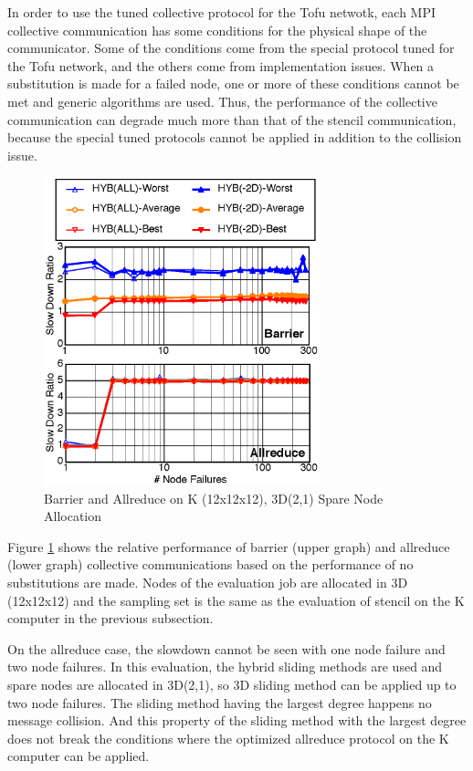 \documentclass[Afour,times,sagev]{sagej}
\begin{document}
In order to use the tuned collective protocol for the Tofu netwotk,
each MPI collective communication has some conditions for the physical
shape of the communicator. Some of the conditions come from the
special protocol tuned for the Tofu network, and the others come from
implementation issues. When a substitution is made for a failed node,
one or more of these conditions cannot be met and generic algorithms
are used. Thus, the performance of the collective communication can
degrade much more than that of the stencil communication, because the
special tuned protocols cannot be applied in addition to the collision
issue. 

\begin{figure}[ht]
\centering
\includegraphics[width=80mm]{Figs/K-Collective-CL.eps}
  \caption{Barrier and Allreduce on K (12x12x12), 3D(2,1) Spare Node
    Allocation}
  \label{fig:k-collective}
\end{figure}

Figure \ref{fig:k-collective} shows the relative performance of
barrier (upper graph) and allreduce (lower graph) collective
communications based on the performance of no substitutions are
made. Nodes of the evaluation job are allocated in 3D (12x12x12) and
the sampling set is the same as the evaluation of stencil on the
K computer in the previous subsection. 

On the allreduce case, the slowdown cannot be seen with one node
failure and two node failures. In this evaluation, the hybrid sliding 
methods are used and spare nodes are allocated in 3D(2,1), so 3D
sliding method can be applied up to two node failures. The sliding
method having the largest degree happens no message collision. And
this property of 
the sliding method with the largest degree does not break the
conditions where the optimized allreduce protocol on the K computer
can be applied. 
\end{document}
